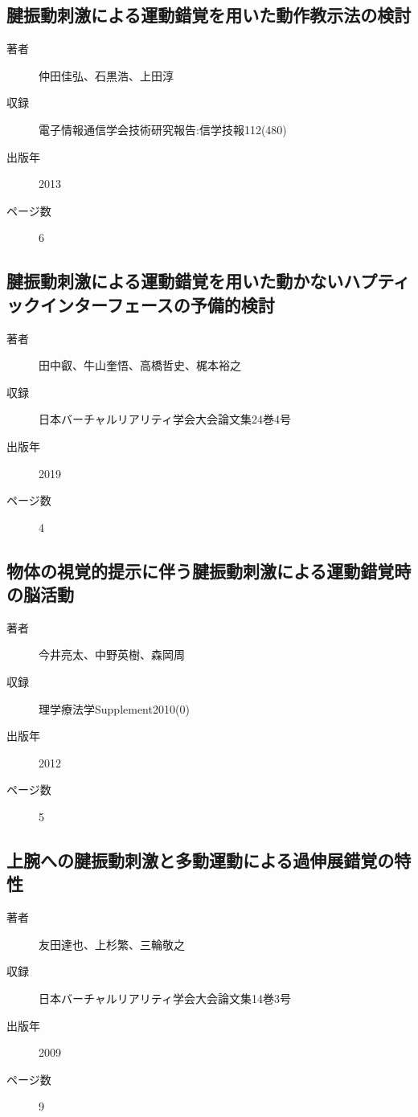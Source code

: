 \documentclass[]{jsarticle}
\begin{document}
    \subsection{腱振動刺激による運動錯覚を用いた動作教示法の検討}
        \begin{description}
            \item[著者] 仲田佳弘、石黒浩、上田淳
            \item[収録] 電子情報通信学会技術研究報告:信学技報112(480)
            \item[出版年] 2013
            \item[ページ数] 6
        \end{description}

    \subsection{腱振動刺激による運動錯覚を用いた動かないハプティックインターフェースの予備的検討}
        \begin{description}
            \item[著者] 田中叡、牛山奎悟、高橋哲史、梶本裕之
            \item[収録] 日本バーチャルリアリティ学会大会論文集24巻4号
            \item[出版年] 2019
            \item[ページ数] 4
        \end{description}

    \subsection{物体の視覚的提示に伴う腱振動刺激による運動錯覚時の脳活動}
        \begin{description}
            \item[著者] 今井亮太、中野英樹、森岡周
            \item[収録] 理学療法学Supplement2010(0)
            \item[出版年] 2012
            \item[ページ数] 5
        \end{description}

    \subsection{上腕への腱振動刺激と多動運動による過伸展錯覚の特性}
        \begin{description}
            \item[著者] 友田達也、上杉繁、三輪敬之
            \item[収録] 日本バーチャルリアリティ学会大会論文集14巻3号
            \item[出版年] 2009
            \item[ページ数] 9
        \end{description}
\end{document}
